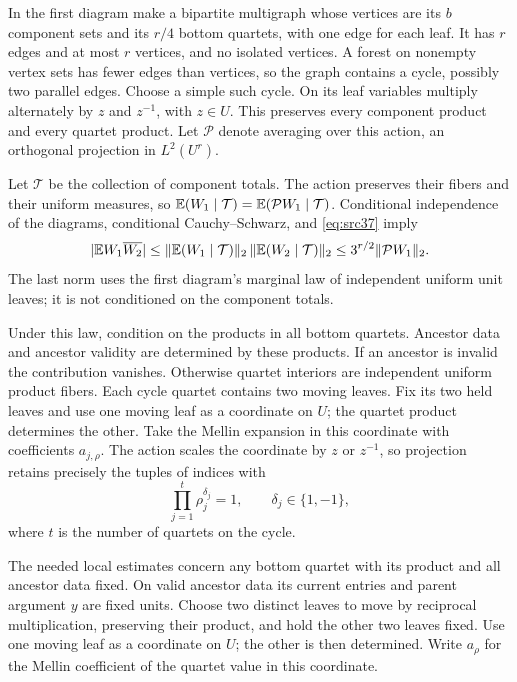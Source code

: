 In the first diagram make a bipartite multigraph whose vertices are its
$b$ component sets and its $r/4$ bottom quartets, with one edge for each
leaf. It has $r$ edges and at most $r$ vertices, and no isolated
vertices. A forest on nonempty vertex sets has fewer edges than
vertices, so the graph contains a cycle, possibly two parallel edges.
Choose a simple such cycle. On its leaf variables multiply alternately
by $z$ and $z^{-1}$, with $z\in U$. This preserves every component
product and every quartet product. Let $\mathcal P$ denote averaging
over this action, an orthogonal projection in $L^2(U^r)$.

Let $\mathcal T$ be the collection of component totals. The action
preserves their fibers and their uniform measures, so
$\mathbb E(W_1\mid\mathcal T)=\mathbb E(\mathcal PW_1\mid\mathcal T)$.
Conditional independence of the diagrams, conditional
Cauchy--Schwarz, and \eqref{eq:src37} imply
\begin{equation}\label{eq:tree-projection-reduction}
 |\mathbb E W_1\overline{W_2}|
 \leq \|\mathbb E(W_1\mid\mathcal T)\|_2\,
       \|\mathbb E(W_2\mid\mathcal T)\|_2
 \leq3^{r/2}\|\mathcal PW_1\|_2.
\end{equation}
The last norm uses the first diagram's marginal law of independent
uniform unit leaves; it is not conditioned on the component totals.

Under this law, condition on the products in all bottom quartets.
Ancestor data and ancestor validity are determined by these products.
If an ancestor is invalid the contribution vanishes. Otherwise quartet
interiors are independent uniform product fibers. Each cycle quartet
contains two moving leaves. Fix its two held leaves and use one moving
leaf as a coordinate on $U$; the quartet product determines the other.
Take the Mellin expansion in this coordinate with coefficients
$a_{j,\rho}$. The action scales the coordinate by $z$ or $z^{-1}$,
so projection retains precisely the tuples of indices with
\begin{equation}\label{eq:tree-cycle-relation}
                         \prod_{j=1}^t\rho_j^{\delta_j}=1,
                    \qquad \delta_j\in\{1,-1\},
\end{equation}
where $t$ is the number of quartets on the cycle.

The needed local estimates concern any bottom quartet with its product
and all ancestor data fixed. On valid ancestor data its current entries
and parent argument $y$ are fixed units. Choose two distinct leaves
to move by reciprocal multiplication, preserving their product, and
hold the other two leaves fixed. Use one moving leaf as a coordinate
on $U$; the other is then determined. Write $a_\rho$ for the Mellin
coefficient of the quartet value in this coordinate.

